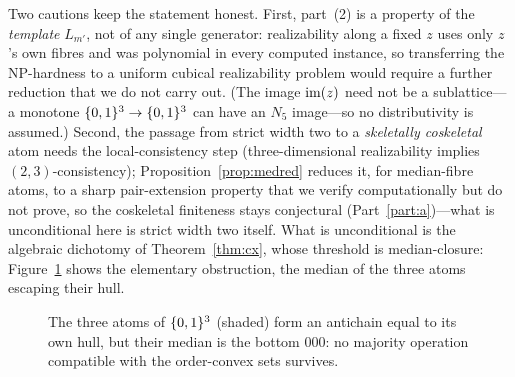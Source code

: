 Two cautions keep the statement honest.  First, part~(2) is a property of
the \emph{template} $L_{m'}$, not of any single generator: realizability
along a fixed $z$ uses only $z$'s own fibres and was polynomial in every
computed instance, so transferring the $\mathrm{NP}$-hardness to a uniform
cubical realizability problem would require a further reduction that we do
not carry out.  (The image $\operatorname{im}(z)$ need not be a sublattice---a monotone
$\{0,1\}^3\to\{0,1\}^3$ can have an $N_5$ image---so no distributivity is assumed.)  Second, the passage
from strict width two to a \emph{skeletally coskeletal} atom needs the
local-consistency step (three-dimensional realizability implies
$(2,3)$-consistency); Proposition~\ref{prop:medred} reduces it, for
median-fibre atoms, to a sharp pair-extension property that we verify
computationally but do not prove, so the coskeletal finiteness stays
conjectural (Part~\ref{part:a})---what is unconditional here is strict
width two itself.
What is unconditional is the algebraic dichotomy of
Theorem~\ref{thm:cx}, whose threshold is median-closure: Figure~\ref{fig:cube}
shows the elementary obstruction, the median of the three atoms escaping
their hull.

\begin{figure}[ht]
\centering
{}
\caption{The three atoms of $\{0,1\}^3$ (shaded) form an antichain equal to
its own hull, but their median is the bottom $000$: no majority
operation compatible with the order-convex sets survives.}
\label{fig:cube}
\end{figure}
